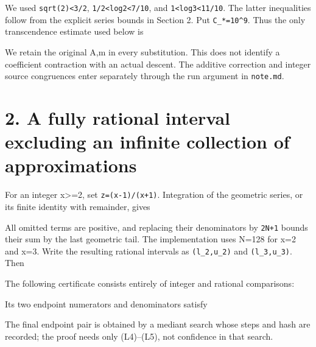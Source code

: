 
We used \nolinkurl{sqrt(2)<3/2}, \nolinkurl{1/2<log2<7/10}, and
\nolinkurl{1<log3<11/10}. The latter inequalities follow from the
explicit series bounds in Section 2. Put \nolinkurl{C_*=10^9}. Thus the
only transcendence estimate used below is


We retain the original A,m in every substitution. This does not identify
a coefficient contraction with an actual descent. The additive
correction and integer source congruences enter separately through the
run argument in \nolinkurl{note.md}.

\section{2. A fully rational interval excluding an infinite collection
of approximations}

For an integer x\textgreater=2, set \nolinkurl{z=(x-1)/(x+1)}.
Integration of the geometric series, or its finite identity with
remainder, gives


All omitted terms are positive, and replacing their denominators by
\nolinkurl{2N+1} bounds their sum by the last geometric tail. The
implementation uses N=128 for x=2 and x=3. Write the resulting rational
intervals as \nolinkurl{(l_2,u_2)} and \nolinkurl{(l_3,u_3)}. Then


The following certificate consists entirely of integer and rational
comparisons:


Its two endpoint numerators and denominators satisfy


The final endpoint pair is obtained by a mediant search whose steps and
hash are recorded; the proof needs only (L4)--(L5), not confidence in
that search.

